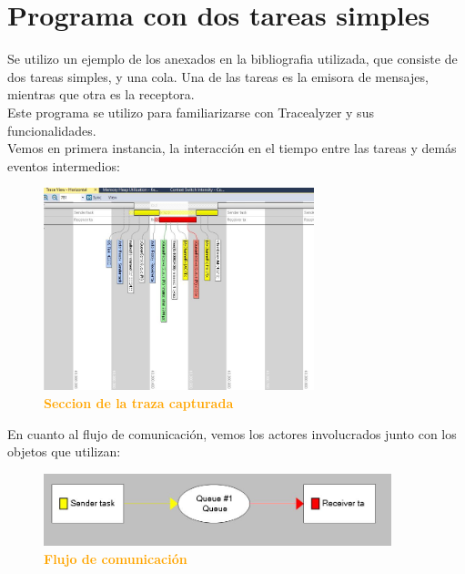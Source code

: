 \documentclass{article}
\begin{document}
\section{Programa con dos tareas simples}

Se utilizo un ejemplo de los anexados en la bibliografia utilizada, que consiste de dos tareas simples, y una cola. Una de las tareas es la emisora de mensajes, mientras que otra
es la receptora. \\

Este programa se utilizo para familiarizarse con Tracealyzer y sus funcionalidades. \\

Vemos en primera instancia, la interacción en el tiempo entre las tareas y demás eventos intermedios:\\
\begin{figure}[H]
   \centering
   \includegraphics[width=0.7\textwidth]{figures/trace1.jpg}
   \centering
   \caption{\textbf{\textcolor{Orange}{Seccion de la traza capturada}}}
\end{figure}

En cuanto al flujo de comunicación, vemos los actores involucrados junto con los objetos que utilizan:\\
\begin{figure}[H]
   \centering
   \includegraphics[width=0.9\textwidth]{figures/trace6.jpg}
   \centering
   \caption{\textbf{\textcolor{Orange}{Flujo de comunicación}}}
\end{figure}

\bigskip
\bigskip
\bigskip
\bigskip
\bigskip
\bigskip
\bigskip
\end{document}
